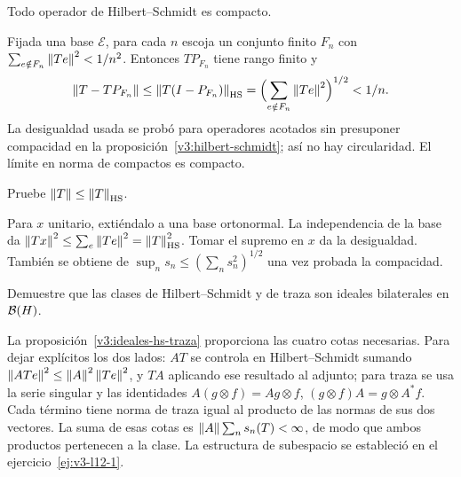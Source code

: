 \begin{ejercicio}\label{ej:v3-l12-2}
Todo operador de Hilbert--Schmidt es compacto.
\end{ejercicio}
\begin{solucion}
Fijada una base $\mathcal E$, para cada $n$ escoja un conjunto finito $F_n$ con $\sum_{e\notin F_n}\left\lVert Te\right\rVert^2<1/n^2$. Entonces $TP_{F_n}$ tiene rango finito y
\[\left\lVert T-TP_{F_n}\right\rVert\le\left\lVert T(I-P_{F_n})\right\rVert_{\mathrm{HS}}
=\Bigl(\sum_{e\notin F_n}\left\lVert Te\right\rVert^2\Bigr)^{1/2}<1/n.
\]
La desigualdad usada se probó para operadores acotados sin presuponer compacidad en la proposición~\ref{v3:hilbert-schmidt}; así no hay circularidad. El límite en norma de compactos es compacto.
\end{solucion}

\begin{ejercicio}\label{ej:v3-l12-3}
Pruebe $\left\lVert T\right\rVert\le\left\lVert T\right\rVert_{\mathrm{HS}}$.
\end{ejercicio}
\begin{solucion}
Para $x$ unitario, extiéndalo a una base ortonormal. La independencia de la base da $\left\lVert Tx\right\rVert^2\le\sum_e\left\lVert Te\right\rVert^2=\left\lVert T\right\rVert_{\mathrm{HS}}^2$. Tomar el supremo en $x$ da la desigualdad. También se obtiene de $\sup_ns_n\le(\sum_ns_n^2)^{1/2}$ una vez probada la compacidad.
\end{solucion}

\begin{ejercicio}\label{ej:v3-l12-4}
Demuestre que las clases de Hilbert--Schmidt y de traza son ideales bilaterales en $\mathcal B(H)$.
\end{ejercicio}
\begin{solucion}
La proposición~\ref{v3:ideales-hs-traza} proporciona las cuatro cotas necesarias. Para dejar explícitos los dos lados: $AT$ se controla en Hilbert--Schmidt sumando $\left\lVert ATe\right\rVert^2\le\left\lVert A\right\rVert^2\left\lVert Te\right\rVert^2$, y $TA$ aplicando ese resultado al adjunto; para traza se usa la serie singular y las identidades $A(g\otimes f)=Ag\otimes f$, $(g\otimes f)A=g\otimes A^*f$. Cada término tiene norma de traza igual al producto de las normas de sus dos vectores. La suma de esas cotas es $\left\lVert A\right\rVert\sum_ns_n(T)<\infty$, de modo que ambos productos pertenecen a la clase. La estructura de subespacio se estableció en el ejercicio~\ref{ej:v3-l12-1}.
\end{solucion}

